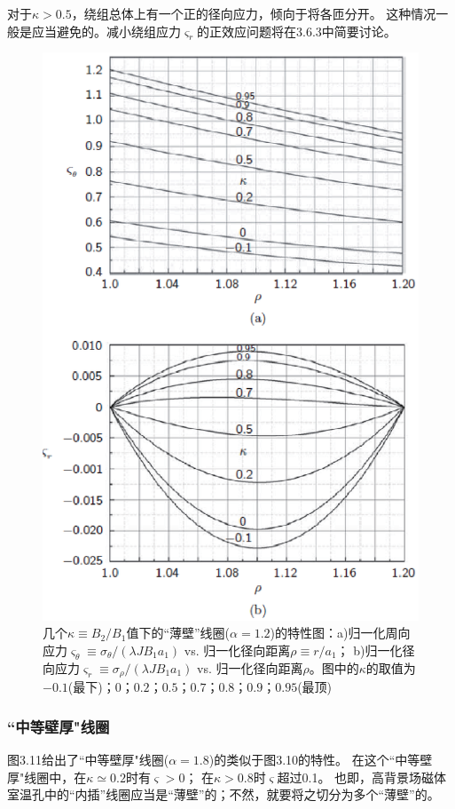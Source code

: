 对于$\kappa>0.5$，绕组总体上有一个正的径向应力，倾向于将各匝分开。
这种情况一般是应当避免的。减小绕组应力$\varsigma_r$的正效应问题将在3.6.3中简要讨论。
\begin{figure}
  \centering
 \includegraphics[scale=0.8]{chpt3/figs/fig3.10.eps}
  \caption{几个$\kappa\equiv B_2/B_1$值下的``薄壁''线圈($\alpha=1.2$)的特性图：a)归一化周向应力$\varsigma_\theta\equiv \sigma_\theta/(\lambda J B_1 a_1)$ vs. 归一化径向距离$\rho\equiv r/a_1$；
  b)归一化径向应力$\varsigma_r \equiv \sigma_\rho/(\lambda J B_1 a_1)$ vs. 归一化径向距离$\rho$。图中的$\kappa$的取值为$-0.1$(最下)；$0$；$0.2$；$0.5$；$0.7$；$0.8$；$0.9$；$0.95$(最顶) }
\end{figure}

\subsubsection{``中等壁厚"线圈}
图3.11给出了``中等壁厚"线圈($\alpha=1.8$)的类似于图3.10的特性。
在这个``中等壁厚"线圈中，在$\kappa\simeq 0.2$时有$\varsigma>0$；
在$\kappa> 0.8$时$\varsigma$超过0.1。
也即，高背景场磁体室温孔中的``内插''线圈应当是``薄壁''的；不然，就要将之切分为多个``薄壁''的。

